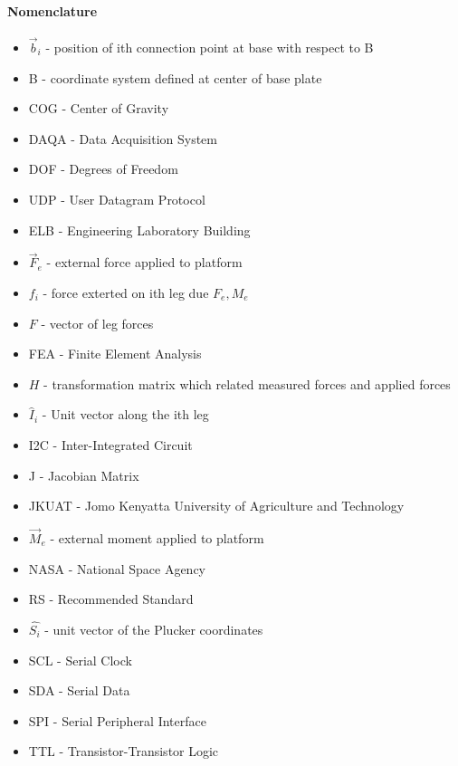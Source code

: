 \paragraph{Nomenclature}
\begin{itemize}
\item $\vec{b}_i$ - position of ith connection point at base with respect to B
\item B - coordinate system defined at center of base plate
\item COG - Center of Gravity
\item DAQA - Data Acquisition System
\item DOF - Degrees of Freedom
\item UDP - User Datagram Protocol
\item ELB - Engineering Laboratory Building
\item $\vec{F}_e$ - external force applied to platform
\item $f_i$ - force exterted on ith leg due $F_e, M_e$
\item $F$ - vector of leg forces
\item FEA - Finite Element Analysis
\item $H$ - transformation matrix which related measured forces and applied forces
\item $\hat{I}_i$ - Unit vector along the ith leg 
\item I2C - Inter-Integrated Circuit 
\item J - Jacobian Matrix 
\item JKUAT - Jomo Kenyatta University of Agriculture and Technology
\item $\vec{M}_e$ - external moment applied to platform
\item NASA - National Space Agency
\item RS - Recommended Standard
\item $\hat{{S_{i}}}$ - unit vector of the Plucker coordinates
\item SCL - Serial Clock
\item SDA - Serial Data
\item SPI - Serial Peripheral Interface
\item TTL - Transistor-Transistor Logic
\end{itemize}
\pagebreak